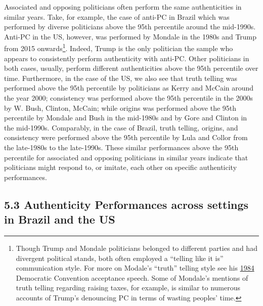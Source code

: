 \documentclass[
  12pt,
]{article}
\begin{document}
Associated and opposing politicians often perform the same
authenticities in similar years. Take, for example, the case of anti-PC
in Brazil which was performed by diverse politicians above the 95th
percentile around the mid-1990s. Anti-PC in the US, however, was
performed by Mondale in the 1980s and Trump from 2015
onwards\footnote{Though Trump and Mondale politicians belonged to
  different parties and had divergent political stands, both often
  employed a ``telling like it is'' communication style. For more on
  Modale's ``truth'' telling style see his
  \href{https://www.nytimes.com/1984/07/20/us/transcript-of-mondale-address-accepting-party-nomination.html}{1984}
  Democratic Convention acceptance speech. Some of Mondale's mentions of
  truth telling regarding raising taxes, for example, is similar to
  numerous accounts of Trump's denouncing PC in terms of wasting
  peoples' time.}. Indeed, Trump is the only politician the sample who
appears to consistently perform authenticity with anti-PC. Other
politicians in both cases, usually, perform different authenticities
above the 95th percentile over time. Furthermore, in the case of the US,
we also see that truth telling was performed above the 95th percentile
by politicians as Kerry and McCain around the year 2000; consistency was
performed above the 95th percentile in the 2000s by W. Bush, Clinton,
McCain; while origins was performed above the 95th percentile by Mondale
and Bush in the mid-1980s and by Gore and Clinton in the mid-1990s.
Comparably, in the case of Brazil, truth telling, origins, and
consistency were performed above the 95th percentile by Lula and Collor
from the late-1980s to the late-1990s. These similar performances above
the 95th percentile for associated and opposing politicians in similar
years indicate that politicians might respond to, or imitate, each other
on specific authenticity performances.

\hypertarget{authenticity-performances-across-settings-in-brazil-and-the-us}{%
\subsection{5.3 Authenticity Performances across settings in Brazil and
the
US}\label{authenticity-performances-across-settings-in-brazil-and-the-us}}
\end{document}
